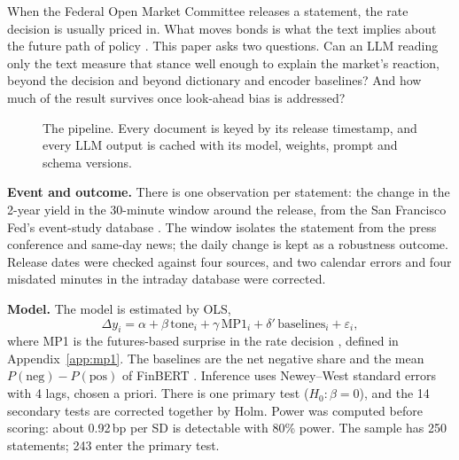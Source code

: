 \documentclass[11pt,a4paper]{article}
\newcommand{\sfb}[1]{{\sffamily\bfseries #1}}
\newcommand{\bp}{\,bp}
\begin{document}
When the Federal Open Market Committee releases a statement, the rate decision is usually
priced in. What moves bonds is what the text implies about the future path of policy
\citep{gss2005}. This paper asks two questions. Can an LLM reading only
the text measure that stance well enough to explain the market's reaction, beyond the decision
and beyond dictionary and encoder baselines? And how much of the result survives once
look-ahead bias is addressed?

\begin{figure}[H]
\centering
{}
\caption{The pipeline. Every document is keyed by its release timestamp, and every LLM output is
cached with its model, weights, prompt and schema versions.}
\end{figure}

\sfb{Event and outcome.} There is one observation per statement: the change in the 2-year
yield in the 30-minute window around the release, from the San Francisco Fed's event-study
database \citep[USMPD;][]{acosta2025}. The window
isolates the statement from the press conference and same-day news; the daily change is kept
as a robustness outcome. Release dates were checked against four sources, and two calendar
errors and four misdated minutes in the intraday database were corrected.

\sfb{Model.} The model is estimated by OLS,
\[
  \Delta y_i = \alpha + \beta\,\mathrm{tone}_i + \gamma\,\mathrm{MP1}_i
  + \delta'\,\mathrm{baselines}_i + \varepsilon_i ,
\]
where MP1 is the futures-based surprise in the rate decision \citep{kuttner2001}, defined in
Appendix~\ref{app:mp1}. The baselines are the \citet{lm2011} net negative share and the mean
$P(\text{neg}) - P(\text{pos})$ of FinBERT \citep{araci2019}. Inference uses Newey--West
standard errors \citep{neweywest1994} with 4 lags, chosen a priori. There is one primary
test ($H_0\!: \beta = 0$), and the 14 secondary tests are corrected together by Holm. Power was
computed before scoring: about 0.92\bp{} per SD is detectable with 80\% power. The sample has
250 statements; 243 enter the primary test.
\end{document}
